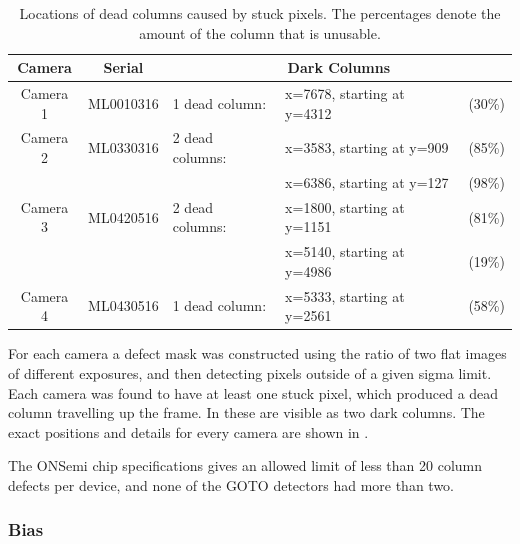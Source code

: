 \begin{colsection}
\begin{colsection}
\begin{table}[t]
    \begin{center}
        \begin{tabular}{cc|lll} %
            Camera   & Serial    & \multicolumn{3}{c}{Dark Columns} \\
            \midrule
            Camera 1 & ML0010316 & 1 dead column:  & x=7678, starting at y=4312 & (30\%) \\
            Camera 2 & ML0330316 & 2 dead columns: & x=3583, starting at y=909  & (85\%) \\
                     &           &                 & x=6386, starting at y=127  & (98\%) \\
            Camera 3 & ML0420516 & 2 dead columns: & x=1800, starting at y=1151 & (81\%) \\
                     &           &                 & x=5140, starting at y=4986 & (19\%) \\
            Camera 4 & ML0430516 & 1 dead column:  & x=5333, starting at y=2561 & (58\%) \\
        \end{tabular}
    \end{center}
    \caption[TODO]{
        Locations of dead columns caused by stuck pixels. The percentages denote the amount of the column that is unusable.
    }\label{tab:frame}
\end{table}

For each camera a defect mask was constructed using the ratio of two flat images of different exposures, and then detecting pixels outside of a given sigma limit. Each camera was found to have at least one stuck pixel, which produced a dead column travelling up the frame. In  these are visible as two dark columns. The exact positions and details for every camera are shown in .

The ONSemi chip specifications gives an allowed limit of less than 20 column defects per device, and none of the GOTO detectors had more than two.

\newpage
\subsubsection{Bias}


\end{colsection}
\end{colsection}
